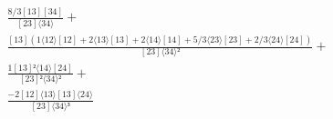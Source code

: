 \documentclass[varwidth, border=5pt]{standalone}
\begin{document}
\begin{my}
$\begin{gathered}
\scriptscriptstyle\frac{8/3[13][34]}{[23]⟨34⟩} +\\
\scriptscriptstyle\frac{[13](1⟨12⟩[12]+2⟨13⟩[13]+2⟨14⟩[14]+5/3⟨23⟩[23]+2/3⟨24⟩[24])}{[23]⟨34⟩²} +\\
\scriptscriptstyle\frac{1[13]²⟨14⟩[24]}{[23]²⟨34⟩²} +\\
\scriptscriptstyle\frac{-2[12]⟨13⟩[13]⟨24⟩}{[23]⟨34⟩³} \phantom{+}
\end{gathered}$
\end{my}
\end{document}
